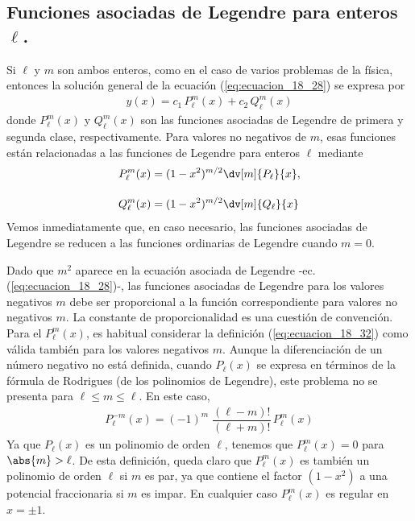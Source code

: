\subsection{Funciones asociadas de Legendre para enteros $\ell$.}
Si $\ell$ y $m$ son ambos enteros, como en el caso de varios problemas de la física, entonces la solución general de la ecuación (\ref{eq:ecuacion_18_28}) se expresa por
\begin{align}
y(x) = c_{1} \, P_{\ell}^{m} (x) + c_{2} \, Q_{\ell}^{m} (x)
\label{eq:ecuacion_18_31}
\end{align}
donde $P_{\ell}^{m} (x)$ y $Q_{\ell}^{m} (x)$ son las funciones asociadas de Legendre de primera y segunda clase, respectivamente. Para valores no negativos de $m$, esas funciones están relacionadas a las funciones de Legendre para enteros $\ell$ mediante
\begin{align}
\begin{aligned}
P_{\ell}^{m} (x) &= (1 - x^{2})^{m/2} \dv[m]{P_{\ell}}{x}, \\[1em]
Q_{\ell}^{m} (x) &= (1 - x^{2})^{m/2} \dv[m]{Q_{\ell}}{x}
\end{aligned}
\label{eq:ecuacion_18_32}
\end{align}
Vemos inmediatamente que, en caso necesario, las funciones asociadas de Legendre se reducen a las funciones ordinarias de Legendre cuando $m = 0$. 
\par
Dado que $m^{2}$ aparece en la ecuación asociada de Legendre -ec. (\ref{eq:ecuacion_18_28})-, las funciones asociadas de Legendre para los valores negativos $m$ debe ser proporcional a la función correspondiente para valores no negativos $m$. La constante de proporcionalidad es una cuestión de convención. Para el $P_{\ell}^{m} (x) $, es habitual considerar la definición (\ref{eq:ecuacion_18_32}) como válida también para los valores negativos $m$. Aunque la diferenciación de un número negativo no está definida, cuando $P_{\ell}(x)$ se expresa en términos de la fórmula de Rodrigues (de los polinomios de Legendre), este problema no se presenta para $\ell \leq m \leq \ell$. En este caso,
\begin{align}
P_{\ell}^{-m} (x) = (-1)^{m} \; \dfrac{(\ell - m)!}{(\ell + m)!} \, P_{\ell}^{m} (x)
\label{eq:ecuacion_18_33}
\end{align}
Ya que $P_{\ell}(x)$ es un polinomio de orden $\ell$, tenemos que $P_{\ell}^{m}(x)=0$ para $\abs{m} > \ell$. De esta definición, queda claro que $P_{\ell}^{m} (x)$ es también un polinomio de orden $\ell$ si $m$ es par, ya que contiene el factor $(1-x^{2})$ a una potencial fraccionaria si $m$ es impar. En cualquier caso $P_{\ell}^{m}(x)$ es regular en $x = \pm 1$.
